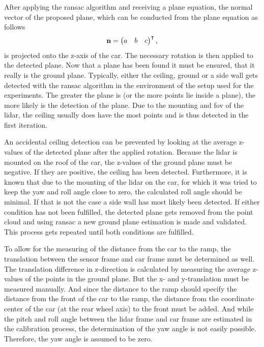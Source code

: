 After applying the \gls{ransac} algorithm and receiving a plane equation, the normal vector of the proposed plane, which can be conducted from the plane equation as follows
\begin{equation}
    \vb{n} = \begin{pmatrix} a & b & c \end{pmatrix}^{\intercal},
\end{equation}
is projected onto the z-axis of the car.
The necessary rotation is then applied to the detected plane.
Now that a plane has been found it must be ensured, that it really is the ground plane.
Typically, either the ceiling, ground or a side wall gets detected with the \gls{ransac} algorithm in the environment of the setup used for the experiments.
The greater the plane is (or the more points lie inside a plane), the more likely is the detection of the plane.
Due to the mounting and \gls{fov} of the \gls{lidar}, the ceiling usually does have the most points and is thus detected in the first iteration.

An accidental ceiling detection can be prevented by looking at the average z-values of the detected plane after the applied rotation.
Because the \gls{lidar} is mounted on the roof of the car, the z-values of the ground plane must be negative.
If they are positive, the ceiling has been detected.
Furthermore, it is known that due to the mounting of the \gls{lidar} on the car, for which it was tried to keep the yaw and roll angle close to zero, the calculated roll angle should be minimal.
If that is not the case a side wall has most likely been detected.
If either condition has not been fulfilled, the detected plane gets removed from the point cloud and using \gls{ransac} a new ground plane estimation is made and validated.
This process gets repeated until both conditions are fulfilled.

To allow for the measuring of the distance from the car to the ramp, the translation between the sensor frame and car frame must be determined as well.
The translation difference in z-direction is calculated by measuring the average z-values of the points in the ground plane.
But the x- and y-translation must be measured manually.
And since the distance to the ramp should specify the distance from the front of the car to the ramp, the distance from the coordinate center of the car (at the rear wheel axis) to the front must be added.
And while the pitch and roll angle between the \gls{lidar} frame and car frame are estimated in the calibration process, the determination of the yaw angle is not easily possible.
Therefore, the yaw angle is assumed to be zero.


